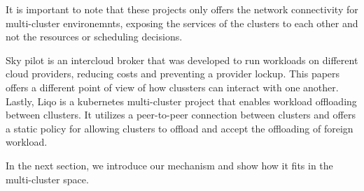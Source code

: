 It is important to note that these projects only offers the network
connectivity for multi-cluster environemnts, exposing the services of the
clusters to each other and not the resources or scheduling decisions.

Sky pilot is an intercloud broker that was developed to run workloads on
different cloud providers, reducing costs and preventing a provider lockup.
This papers offers a different point of view of how clussters can interact with
one another. 
Lastly, Liqo is a kubernetes multi-cluster project that enables workload
offloading between cllusters. It utilizes a peer-to-peer connection between
clusters and offers a static policy for allowing clusters to offload and
accept the offloading of foreign workload. 

In the next section, we introduce our mechanism and show how it fits in the
multi-cluster space.
